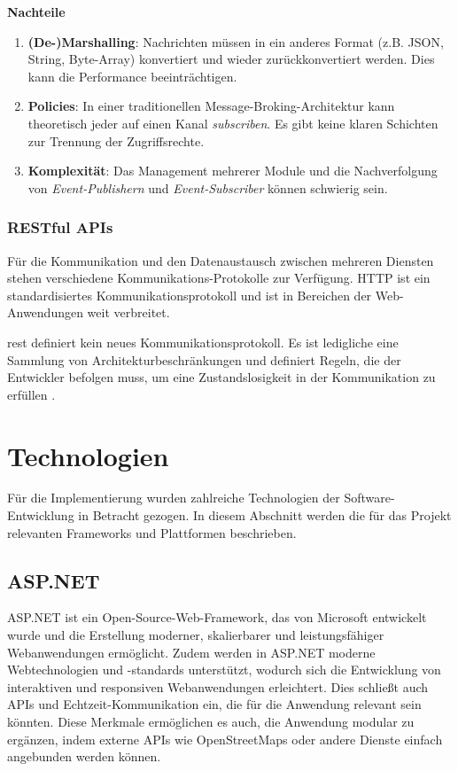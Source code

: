\textbf{Nachteile}

\begin{enumerate}
    \item \textbf{(De-)Marshalling}: Nachrichten müssen in ein anderes Format (z.B. JSON, String, Byte-Array) konvertiert und wieder zurückkonvertiert werden. Dies kann die Performance beeinträchtigen.
    \item \textbf{Policies}: In einer traditionellen Message-Broking-Architektur kann theoretisch jeder auf einen Kanal \textit{subscriben}. Es gibt keine klaren Schichten zur Trennung der Zugriffsrechte.
    \item \textbf{Komplexität}: Das Management mehrerer Module und die Nachverfolgung von \textit{Event-Publishern} und \textit{Event-Subscriber} können schwierig sein.
\end{enumerate}

\subsubsection{RESTful APIs} \label{cha:grundlagen:collaboration:rest}

Für die Kommunikation und den Datenaustausch zwischen mehreren Diensten stehen verschiedene Kommunikations-Protokolle zur Verfügung. HTTP ist ein standardisiertes Kommunikationsprotokoll und ist in Bereichen der Web-Anwendungen weit verbreitet.

\ac{rest} definiert kein neues Kommunikationsprotokoll. Es ist ledigliche eine Sammlung von Architekturbeschränkungen und definiert Regeln, die der Entwickler befolgen muss, um eine Zustandslosigkeit in der Kommunikation zu erfüllen \autocite{RedHat2023}.

\section{Technologien}

Für die Implementierung wurden zahlreiche Technologien der Software-Entwicklung in Betracht gezogen. In diesem Abschnitt werden die für das Projekt relevanten Frameworks und Plattformen beschrieben.

\subsection{ASP.NET}

ASP.NET ist ein Open-Source-Web-Framework, das von Microsoft entwickelt wurde und die Erstellung moderner, skalierbarer und leistungsfähiger Webanwendungen ermöglicht. Zudem werden in ASP.NET moderne Webtechnologien und -standards unterstützt, wodurch sich die Entwicklung von interaktiven und responsiven Webanwendungen erleichtert. Dies schließt auch APIs und Echtzeit-Kommunikation ein, die für die Anwendung relevant sein könnten. Diese Merkmale ermöglichen es auch, die Anwendung modular zu ergänzen, indem externe APIs wie OpenStreetMaps oder andere Dienste einfach angebunden werden können.

